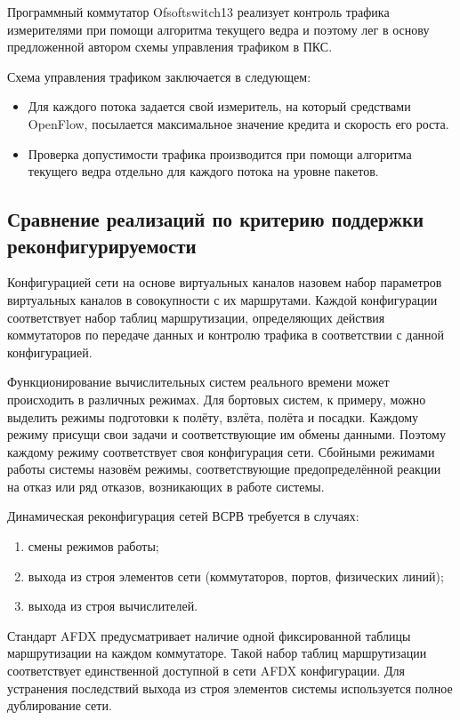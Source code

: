 \documentclass[12pt, a4paper]{article}
\begin{document}
Программный коммутатор Ofsoftswitch13 \cite{ofsoftswitch} реализует контроль трафика измерителями при помощи алгоритма текущего ведра и поэтому лег в основу предложенной автором схемы управления трафиком в ПКС.

Схема управления трафиком заключается в следующем:
\begin{itemize}
	\item Для каждого потока задается свой измеритель, на который средствами OpenFlow, посылается максимальное значение кредита и скорость его роста.
	\item Проверка допустимости трафика производится при помощи алгоритма текущего ведра отдельно для каждого потока на уровне пакетов.
\end{itemize}

\FloatBarrier
\subsection{Сравнение реализаций по критерию поддержки реконфигурируемости} \label{subsec:reconf}

Конфигурацией сети на основе виртуальных каналов назовем набор параметров виртуальных каналов в совокупности с их маршрутами. Каждой конфигурации соответствует набор таблиц маршрутизации, определяющих действия коммутаторов по передаче данных и контролю трафика в соответствии с данной конфигурацией.

Функционирование вычислительных систем реального времени может происходить в различных режимах. Для бортовых систем, к примеру, можно выделить режимы подготовки к полёту, взлёта, полёта и посадки. Каждому режиму присущи свои задачи и соответствующие им обмены данными. Поэтому каждому режиму соответствует своя конфигурация сети. Сбойными режимами работы системы назовём режимы, соответствующие предопределённой реакции на отказ или ряд отказов, возникающих в работе системы.

Динамическая реконфигурация сетей ВСРВ требуется в случаях:
\begin{enumerate}
	\item смены режимов работы;
	\item выхода из строя элементов сети (коммутаторов, портов, физических линий);
	\item выхода из строя вычислителей.
\end{enumerate}

Стандарт AFDX предусматривает наличие одной фиксированной таблицы маршрутизации на каждом коммутаторе. Такой набор таблиц маршрутизации соответствует единственной доступной в сети AFDX конфигурации. Для устранения последствий выхода из строя элементов системы используется полное дублирование сети.
\end{document}
